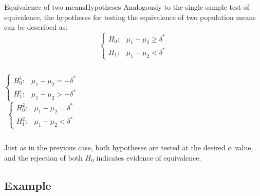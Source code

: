 \begin{frame}{Equivalence of two means}{Hypotheses}
Analogously to the single sample test of equivalence, the hypotheses for testing the equivalence of two population means can be described as:
\begin{equation*}
\begin{cases}
H_0: &\mu_1-\mu_2 \geq\delta^*\\
H_1: &\mu_1-\mu_2 <\delta^*
\end{cases}
\end{equation*}
\hrulefill

\begin{columns}[T]
\begin{equation*}
\begin{cases}
H_0^1: &\mu_1-\mu_2 = -\delta^*\\
H_1^1: &\mu_1-\mu_2 > -\delta^*
\end{cases}
\end{equation*}
\begin{equation*}
\begin{cases}
H_0^2: &\mu_1-\mu_2 = \delta^*\\
H_1^2: &\mu_1-\mu_2 < \delta^*
\end{cases}
\end{equation*}
\end{columns}
\bigskip

Just as in the previous case, both hypotheses are tested at the desired $\alpha$ value, and the rejection of both $H_0$ indicates evidence of equivalence.
\end{frame}



%
%
%
%

\subsection{Example}

